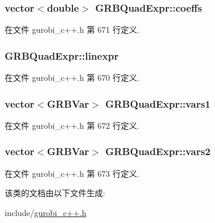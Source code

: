 \subsubsection[{\texorpdfstring{coeffs}{coeffs}}]{\setlength{\rightskip}{0pt plus 5cm}vector$<$double$>$ G\+R\+B\+Quad\+Expr\+::coeffs\hspace{0.3cm}{\ttfamily [private]}}\hypertarget{classGRBQuadExpr_ad76d7cc3a36808156873d166da9383bd}{}\label{classGRBQuadExpr_ad76d7cc3a36808156873d166da9383bd}


在文件 gurobi\+\_\+c++.\+h 第 671 行定义.

\subsubsection[{\texorpdfstring{linexpr}{linexpr}}]{ G\+R\+B\+Quad\+Expr\+::linexpr\hspace{0.3cm}{\ttfamily [private]}}\hypertarget{classGRBQuadExpr_a64271f5613f18c638c5151135924a5c4}{}\label{classGRBQuadExpr_a64271f5613f18c638c5151135924a5c4}


在文件 gurobi\+\_\+c++.\+h 第 670 行定义.

\subsubsection[{\texorpdfstring{vars1}{vars1}}]{\setlength{\rightskip}{0pt plus 5cm}vector$<${\bf G\+R\+B\+Var}$>$ G\+R\+B\+Quad\+Expr\+::vars1\hspace{0.3cm}{\ttfamily [private]}}\hypertarget{classGRBQuadExpr_a37c9db4ad0b8f77e99e9305e52f9f44c}{}\label{classGRBQuadExpr_a37c9db4ad0b8f77e99e9305e52f9f44c}


在文件 gurobi\+\_\+c++.\+h 第 672 行定义.

\subsubsection[{\texorpdfstring{vars2}{vars2}}]{\setlength{\rightskip}{0pt plus 5cm}vector$<${\bf G\+R\+B\+Var}$>$ G\+R\+B\+Quad\+Expr\+::vars2\hspace{0.3cm}{\ttfamily [private]}}\hypertarget{classGRBQuadExpr_a3a8446260dbb63555ab6bc4bf9e2fd1d}{}\label{classGRBQuadExpr_a3a8446260dbb63555ab6bc4bf9e2fd1d}


在文件 gurobi\+\_\+c++.\+h 第 673 行定义.



该类的文档由以下文件生成\+:\begin{DoxyCompactItemize}
\item 
include/\hyperlink{gurobi__c_09_09_8h}{gurobi\+\_\+c++.\+h}\end{DoxyCompactItemize}
